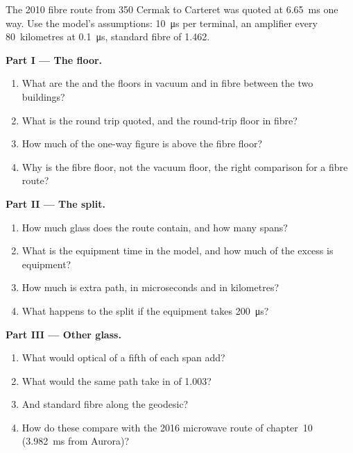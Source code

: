 \begin{problem}\label{pb:nw:long-haul-fibre:1}
The 2010 fibre route from 350 Cermak to Carteret was quoted at \qty{6.65}{\milli\second} one way. Use the model's assumptions: \qty{10}{\micro\second}
per terminal, an amplifier every 80~kilometres at \qty{0.1}{\micro\second}, standard fibre of  1.462.

\medskip\noindent\textbf{Part I --- The floor.}
\begin{enumerate}
\item What are the  and the floors in vacuum and in fibre between the two buildings?
\item What is the round trip quoted, and the round-trip floor in fibre?
\item How much of the one-way figure is above the fibre floor?
\item Why is the fibre floor, not the vacuum floor, the right comparison for a fibre route?
\end{enumerate}

\medskip\noindent\textbf{Part II --- The split.}
\begin{enumerate}[resume]
\item How much glass does the route contain, and how many spans?
\item What is the equipment time in the model, and how much of the excess is equipment?
\item How much is extra path, in microseconds and in kilometres?
\item What happens to the split if the equipment takes \qty{200}{\micro\second}?
\end{enumerate}

\medskip\noindent\textbf{Part III --- Other glass.}
\begin{enumerate}[resume]
\item What would optical  of a fifth of each span add?
\item What would the same path take in  of  1.003?
\item And standard fibre along the geodesic?
\item How do these compare with the 2016 microwave route of chapter~10 (\qty{3.982}{\milli\second} from Aurora)?
\end{enumerate}


\end{problem}
